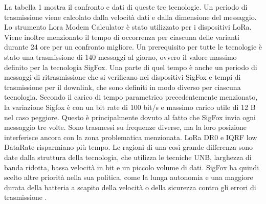 \documentclass[a4paper]{report} %
\begin{document}
La tabella 1 mostra il confronto e dati di queste tre tecnologie. Un periodo di trasmissione viene calcolato dalla velocità dati e dalla dimensione del messaggio. Lo strumento Lora Modem Calculator è stato utilizzato per i dispositivi LoRa. Viene inoltre menzionato il tempo di occorrenza per ciascuna delle varianti durante 24 ore per un confronto migliore. Un prerequisito per tutte le tecnologie è stato una trasmissione di 140 messaggi al giorno, ovvero il valore massimo definito per la tecnologia SigFox. Una parte di quel tempo è anche un periodo di messaggi di ritrasmissione che si verificano nei dispositivi SigFox e tempi di trasmissione per il downlink, che sono definiti in modo diverso per ciascuna tecnologia. Secondo il carico di tempo parametrico precedentemente menzionato, la variazione Sigfox è con un bit rate di 100 bit/s e massimo carico utile di 12 B nel caso peggiore. Questo è principalmente dovuto al fatto che SigFox invia ogni messaggio tre volte. Sono trasmessi su frequenze diverse, ma la loro posizione interferisce ancora con la zona problematica menzionata. LoRa DR0 e IQRF low DataRate risparmiano più tempo. Le ragioni di una così grande differenza sono date dalla struttura della tecnologia, che utilizza le tecniche UNB, larghezza di banda ridotta, bassa velocità in bit e un piccolo volume di dati. SigFox ha quindi scelto altre priorità nella sua politica, come la lunga autonomia e una maggiore durata della batteria a scapito della velocità o della sicurezza contro gli errori di trasmissione \cite{art:rif.46}.
\end{document}
